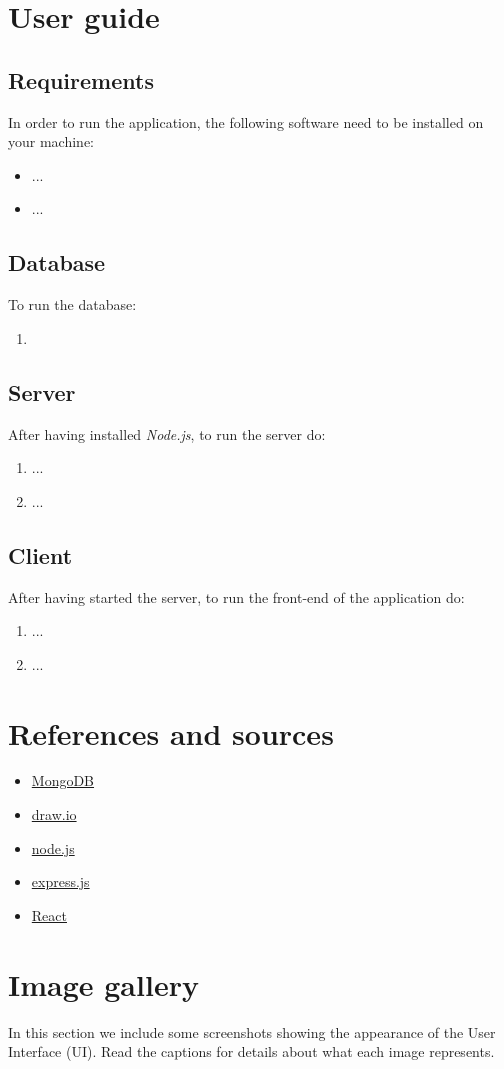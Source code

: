 \documentclass{article}
\begin{document}
\section{User guide}
\subsection{Requirements}
In order to run the application, the following software need to be installed on your machine:
\begin{itemize}
    \item ...
    \item ...
\end{itemize}
\subsection{Database}
To run the database:
\begin{enumerate}
    \item 
\end{enumerate}
\subsection{Server}
After having installed \textit{Node.js}, to run the server do:
\begin{enumerate}
    \item ...
    \item ...
\end{enumerate}
\subsection{Client}
After having started the server, to run the front-end of the application do:
\begin{enumerate}
    \item ...
    \item ...
\end{enumerate}
\section{References and sources}
\begin{itemize}
    \item \href{https://www.mongodb.com}{MongoDB}
    \item \href{https://app.diagrams.net}{draw.io}
    \item \href{https://nodejs.org}{node.js}
    \item \href{https://expressjs.com}{express.js}
    \item \href{https://reactjs.org/}{React}
\end{itemize}
\section{Image gallery}
In this section we include some screenshots showing the appearance of the User Interface (UI). Read the captions for details about what each image represents.
    
\end{document}
